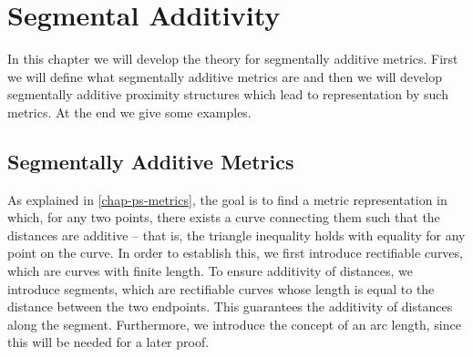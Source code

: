\chapter{Segmental Additivity} \label{chap-seg-additivity}

In this chapter we will develop the theory for segmentally additive metrics. First we will define what segmentally additive metrics are and then we will develop segmentally additive proximity structures which lead to representation by such metrics. At the end we give some examples.

\section{Segmentally Additive Metrics} \label{sec-seg-add-metrics}

As explained in \cref{chap-ps-metrics}, the goal is to find a metric representation in which, for any two points, there exists a curve connecting them such that the distances are additive -- that is, the triangle inequality holds with equality for any point on the curve.
In order to establish this, we first introduce rectifiable curves, which are curves with finite length.
To ensure additivity of distances, we introduce segments, which are rectifiable curves whose length is equal to the distance between the two endpoints. This guarantees the additivity of distances along the segment.
Furthermore, we introduce the concept of an arc length, since this will be needed for a later proof.
